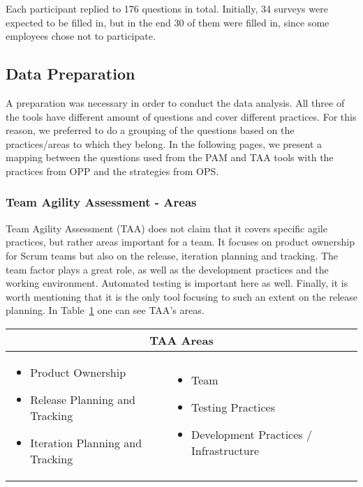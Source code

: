 Each participant replied to 176 questions in total. Initially, 34 surveys were expected to be filled in, but in the end 30 of them were filled in, since some employees chose not to participate.

\subsection{Data Preparation}
\label{subsec:data_preparation}
A preparation was necessary in order to conduct the data analysis. All three of the tools have different amount of questions and cover different practices. For this reason, we preferred to do a grouping of the questions based on the practices/areas to which they belong. In the following pages, we present a mapping between the questions used from the \ac{PAM} and \ac{TAA} tools with the practices from \ac{OPP} and the strategies from \ac{OPS}.

\subsubsection[\ac{TAA} Areas]{Team Agility Assessment - Areas}
Team Agility Assessment (\ac{TAA}) does not claim that it covers specific agile practices, but rather areas important for a team. It focuses on product ownership for Scrum teams but also on the release, iteration planning and tracking. The team factor plays a great role, as well as the development practices and the working environment. Automated testing is important here as well. Finally, it is worth mentioning that it is the only tool focusing to such an extent on the release planning. In Table~\ref{table:taa_practices} one can see \ac{TAA}'s areas.

\begin{table}
  \begin{tabular}{| p{5cm} p{5cm} |}
    \hline
    \multicolumn{2}{|c|}{\textbf{\ac{TAA} Areas}}  \\ \hline
     \begin{itemize} \item Product Ownership \item Release Planning and Tracking \item Iteration Planning and Tracking \end{itemize} &
     \begin{itemize}  \item Team \item Testing Practices \item Development Practices / Infrastructure \end{itemize}  \\ \hline
  \end{tabular}
  \label{table:taa_practices}
\end{table}

